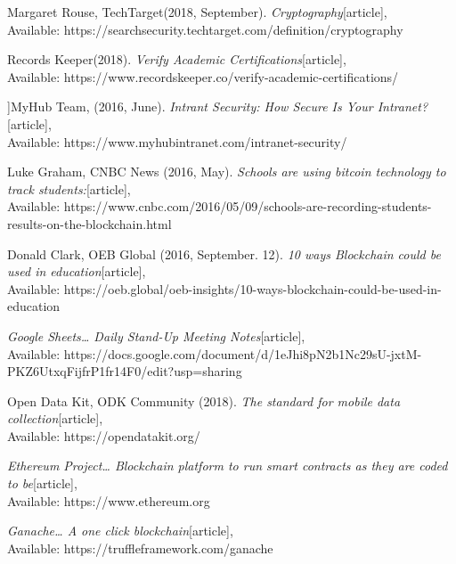 \begin{thebibliography}{10}

Margaret Rouse, TechTarget(2018, September).
\emph{Cryptography}[article],\\
Available: {https://searchsecurity.techtarget.com/definition/cryptography}

 Records Keeper(2018).
\emph{Verify Academic Certifications}[article],\\
Available: {https://www.recordskeeper.co/verify-academic-certifications/}


]MyHub Team, (2016, June).
\emph{Intrant Security: How Secure Is Your Intranet?}[article],\\
Available: {https://www.myhubintranet.com/intranet-security/}

Luke Graham, CNBC News (2016, May).
\emph{Schools are using bitcoin technology to track students:}[article],\\
Available: {https://www.cnbc.com/2016/05/09/schools-are-recording-students-results-on-the-blockchain.html}

Donald Clark, OEB Global (2016, September. 12).
\emph{10 ways Blockchain could be used in education}[article],\\
Available: {https://oeb.global/oeb-insights/10-ways-blockchain-could-be-used-in-education}

\emph{Google Sheets… Daily Stand-Up Meeting Notes}[article],\\
Available: {https://docs.google.com/document/d/1eJhi8pN2b1Nc29sU-jxtM-PKZ6UtxqFijfrP1fr14F0/edit?usp=sharing}

 Open Data Kit, ODK Community (2018).
\emph{The standard for mobile data collection}[article],\\
Available: {https://opendatakit.org/}


\emph{Ethereum Project… Blockchain platform to run smart contracts as they are coded to be}[article],\\
Available: {https://www.ethereum.org}

\emph{Ganache… A one click blockchain}[article],\\
Available: {https://truffleframework.com/ganache}



\end{thebibliography}

\newpage